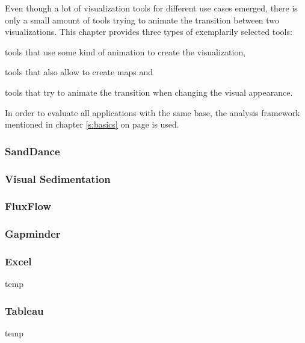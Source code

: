 Even though a lot of visualization tools for different use cases emerged, there is only a small amount of tools trying to animate the transition between two visualizations. This chapter provides three types of exemplarily selected tools:

\begin{enumerate*}
\item tools that use some kind of animation to create the visualization,
\item tools that also allow to create maps and
\item tools that try to animate the transition when changing the visual appearance.
\end{enumerate*}

In order to evaluate all applications with the same base, the analysis framework mentioned in chapter \ref{s:basics} on page \pageref{s:basics} is used.

\subsubsection{SandDance}


\subsubsection{Visual Sedimentation}


\subsubsection{FluxFlow}


\subsubsection{Gapminder}


\subsubsection{Excel}
temp

\subsubsection{Tableau}
temp 


